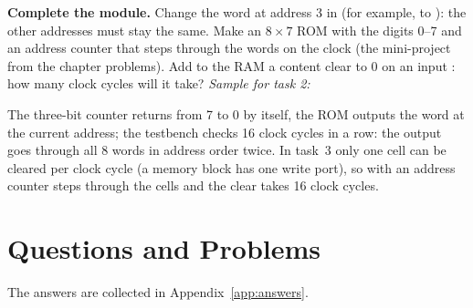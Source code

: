 \textbf{Complete the module.}  Change the word at address 3 in
 (for example, to ): the other addresses must stay the
same.  Make an $8\times7$ ROM with the digits 0--7 and an address
counter that steps through the words on the clock (the mini-project from the
chapter problems).  Add to the RAM a content clear to 0 on an input
: how many clock cycles will it take? \emph{Sample for task 2:}


The three-bit counter  returns from 7 to 0 by itself, the ROM outputs
the word at the current address; the testbench  checks 16
clock cycles in a row: the output goes through all 8 words in address order twice.
In task~3 only one cell can be cleared per clock cycle (a memory block has one
write port), so with  an address counter steps through the cells and
the clear takes 16 clock cycles.

\section{Questions and Problems}
\label{sec:tasks-sync}

The answers are collected in Appendix~\ref{app:answers}.

